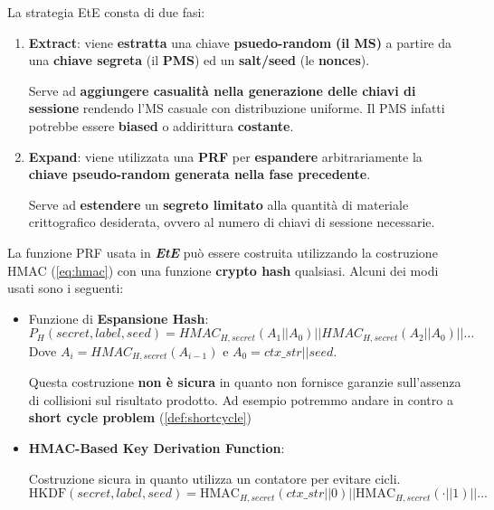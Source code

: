 \begin{definition}\label{def:ete}
La strategia EtE consta di due fasi:
\begin{enumerate}
    \item \textbf{Extract}: viene \textbf{estratta} una chiave\textbf{ psuedo-random} \textbf{(il MS)} a partire da una\textbf{ chiave segreta} (il \textbf{PMS}) ed un \textbf{salt/seed} (le \textbf{nonces}). \\
    \begin{remark}
    Serve ad \textbf{aggiungere casualità nella generazione delle chiavi di sessione} rendendo l'MS casuale con distribuzione uniforme. Il PMS infatti potrebbe essere \textbf{biased} o addirittura \textbf{costante}.
    \end{remark}
    \item \textbf{Expand}: viene utilizzata una \textbf{PRF} per \textbf{espandere} arbitrariamente la \textbf{chiave pseudo-random generata nella fase precedente}. \\
    \begin{remark}
    Serve ad \textbf{estendere} un\textbf{ segreto limitato} alla quantità di materiale crittografico desiderata, ovvero al numero di chiavi di sessione necessarie.
    \end{remark}
\end{enumerate}
\end{definition}\pagebreak
La funzione PRF usata in \textit{\textbf{EtE}} può essere costruita utilizzando la costruzione HMAC (\cref{eq:hmac}) con una funzione \textbf{crypto hash} qualsiasi. Alcuni dei modi usati sono i seguenti:
\begin{itemize}
    \item Funzione di \textbf{Espansione Hash}:
    \[P_H(secret, label,seed)=HMAC_{H,secret}(A_1||A_0)||HMAC_{H,secret}(A_2||A_0)||\dots
    \]
    Dove $A_i=HMAC_{H,secret}(A_{i-1})$ e $A_0=ctx\_str||seed$. 
    \begin{note}
    Questa costruzione \textbf{non è sicura} in quanto non fornisce garanzie sull'assenza di collisioni sul risultato prodotto. Ad esempio potremmo andare in contro a \textbf{short cycle problem} (\cref{def:shortcycle})
    \end{note}
    \item \textbf{HMAC-Based Key Derivation Function}:
    \begin{definition}[HKDF]\label{def:hkdf}
    Costruzione sicura in quanto utilizza un contatore per evitare cicli.
    \[\text{HKDF}(secret,label,seed)=\text{HMAC}_{H,secret}(ctx\_str||0)||\text{HMAC}_{H,secret}(\cdot||1)||\dots\]
    \end{definition}
\end{itemize}
